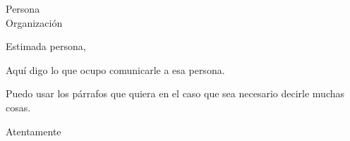 \documentclass{letter}
\begin{document}
\begin{letter}{Persona  \\ Organización}
  \opening{Estimada persona,}

  Aquí digo lo que ocupo comunicarle a esa persona.

  Puedo usar los párrafos que quiera en el caso que sea necesario decirle muchas cosas.
  
  \closing{Atentamente}

\end{letter}
\end{document}
